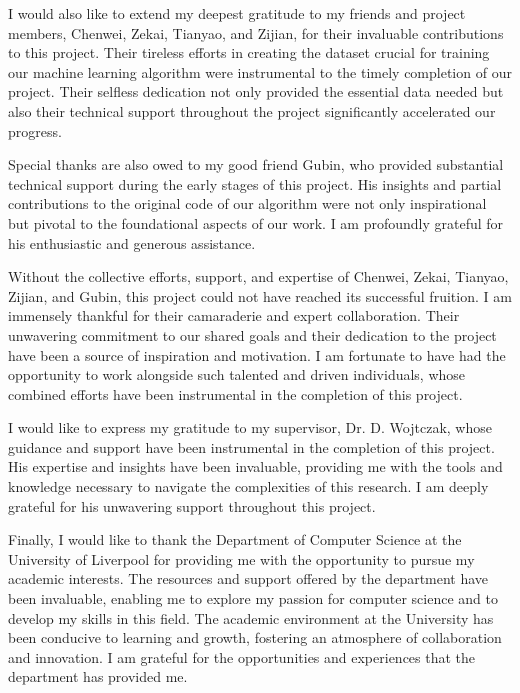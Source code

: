 \documentclass[twocolumn]{article}
\begin{document}
        I would also like to extend my deepest gratitude to my friends and project members, Chenwei, Zekai, Tianyao, and Zijian, for their invaluable contributions to this project. Their tireless efforts in creating the dataset crucial for training our machine learning algorithm were instrumental to the timely completion of our project. Their selfless dedication not only provided the essential data needed but also their technical support throughout the project significantly accelerated our progress.

        Special thanks are also owed to my good friend Gubin, who provided substantial technical support during the early stages of this project. His insights and partial contributions to the original code of our algorithm were not only inspirational but pivotal to the foundational aspects of our work. I am profoundly grateful for his enthusiastic and generous assistance.
        
        Without the collective efforts, support, and expertise of Chenwei, Zekai, Tianyao, Zijian, and Gubin, this project could not have reached its successful fruition. I am immensely thankful for their camaraderie and expert collaboration. Their unwavering commitment to our shared goals and their dedication to the project have been a source of inspiration and motivation. I am fortunate to have had the opportunity to work alongside such talented and driven individuals, whose combined efforts have been instrumental in the completion of this project.

        I would like to express my gratitude to my supervisor, Dr. D. Wojtczak, whose guidance and support have been instrumental in the completion of this project. His expertise and insights have been invaluable, providing me with the tools and knowledge necessary to navigate the complexities of this research. I am deeply grateful for his unwavering support throughout this project.

        Finally, I would like to thank the Department of Computer Science at the University of Liverpool for providing me with the opportunity to pursue my academic interests. The resources and support offered by the department have been invaluable, enabling me to explore my passion for computer science and to develop my skills in this field. The academic environment at the University has been conducive to learning and growth, fostering an atmosphere of collaboration and innovation. I am grateful for the opportunities and experiences that the department has provided me.
\end{document}
